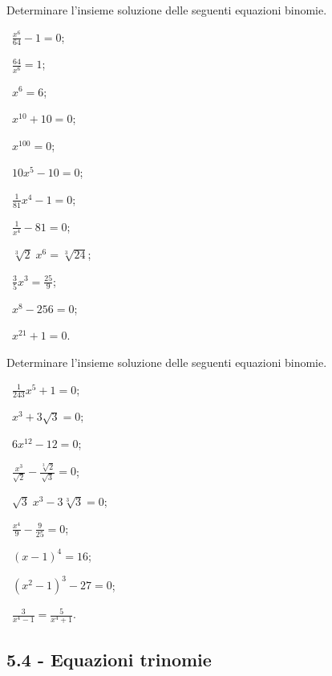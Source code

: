 \begin{esercizio}
 \label{ese:5.16}
Determinare l'insieme soluzione delle seguenti equazioni binomie.
\begin{multicols}{3}
 \begin{enumeratea}
 \item~$\frac{x^6}{64}-1=0$;
 \item~$\frac{64}{x^6}=1$;
 \item~$x^6=6$;
 \item~$x^{10}+10=0$;
 \item~$x^{100}=0$;
 \item~$10x^5-10=0$;
 \item~$\frac 1{81}x^4-1=0$;
 \item~$\frac 1{x^4}-81=0$;
 \item~$\sqrt[3]2\;x^6=\sqrt[3]{24}$;
 \item~$\frac 3 5x^3=\frac{25} 9$;
 \item~$x^8-256=0$;
 \item~$x^{21}+1=0$.
 \end{enumeratea}
 \end{multicols}
\end{esercizio}

\begin{esercizio}[\Ast]
 \label{ese:5.17}
Determinare l'insieme soluzione delle seguenti equazioni binomie.
\begin{multicols}{3}
 \begin{enumeratea}
 \item~$\frac 1{243}x^5+1=0$;
 \item~$x^3+3\sqrt 3=0$;
 \item~$6x^{12}-12=0$;
 \item~$\frac{x^3}{\sqrt 2}-\frac{\sqrt[3]2}{\sqrt 3}=0$;
 \item~$\sqrt 3\;x^3-3\sqrt[3]3=0$;
 \item~$\frac{x^4} 9-\frac 9{25}=0$;
 \item~$(x-1)^4=16$;
 \item~$(x^2-1)^3-27=0$;
 \item~$ \frac 3{x^4-1}=\frac 5{x^4+1} $.
 \end{enumeratea}
 \end{multicols}
\end{esercizio}

\subsection*{5.4 - Equazioni trinomie}

